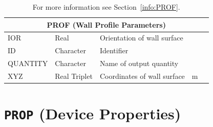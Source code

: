 \documentclass[11pt]{book}
\begin{document}
\hspace{1in}

\begin{table}[H]
\caption{For more information see Section~\ref{info:PROF}.}\label{tbl:PROF}
\noindent
\begin{tabular*}{\textwidth}{@{\extracolsep{\fill}}|l|l|l|l|l|}
\hline
\multicolumn{5}{|c|}{{\ct PROF} (Wall Profile Parameters)} \\ \hline \hline
{\ct IOR}      & Real             & Orientation of wall surface      &            &     \\ \hline
{\ct ID}       & Character        & Identifier                       &            &     \\ \hline
{\ct QUANTITY} & Character        & Name of output quantity          &            &     \\ \hline
{\ct XYZ}      & Real Triplet     & Coordinates of wall surface      & m          &     \\ \hline
\end{tabular*}
\end{table}

\vspace{\baselineskip}

\vfill

\section{\texorpdfstring{{\tt PROP}}{PROP} (Device Properties)}

\hspace{1in}
\end{document}

